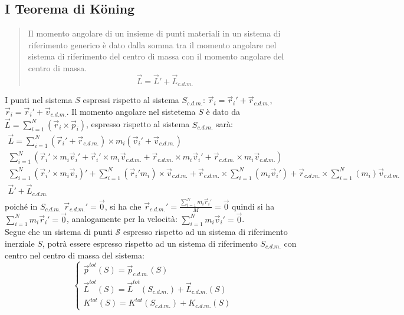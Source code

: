 \documentclass{article}
\numberwithin{equation}{subsection}
\begin{document}
\subsection{I Teorema di K\"oning}
\begin{quotation}
    Il momento angolare di un insieme di punti materiali in un 
    sistema di riferimento generico è dato dalla somma tra 
    il momento angolare nel sistema di riferimento del centro 
    di massa con il momento angolare del centro di massa.
    \begin{equation}
        \vec{L}=\vec{L}'+\vec{L}_{c.d.m.}
    \end{equation}
\end{quotation}
I punti nel sistema $S$ espressi rispetto al sistema $S_{c.d.m.}$: $\vec{r}_i=\vec{r}_i'+\vec{r}_{c.d.m.}$, 
$\vec{r}_i=\vec{r}_i'+\vec{v}_{c.d.m.}$.
Il momento angolare nel sistetema $S$ è dato da $\vec{L}=\displaystyle\sum_{i=1}^{N}(\vec{r}_i\times\vec{p}_i)$, 
espresso rispetto al sistema $S_{c.d.m.}$ sarà: 
\begin{gather}
    \vec{L}=\displaystyle\sum_{i=1}^{N}(\vec{r}_i'+\vec{r}_{c.d.m.})\times m_i(\vec{v}_i'+\vec{v}_{c.d.m.})\\
    \displaystyle\sum_{i=1}^{N}\left(\vec{r}_i'\times m_i\vec{v}_i'+\vec{r}_i'\times m_i\vec{v}_{c.d.m.}+\vec{r}_{c.d.m.}\times m_i\vec{v}_i'+\vec{r}_{c.d.m.}\times m_i\vec{v}_{c.d.m.}\right)\\
    \displaystyle\sum_{i=1}^{N}(\vec{r}_i'\times m_i\vec{v}_i)'+\sum_{i=1}^{N}(\vec{r}_i'm_i)\times \vec{v}_{c.d.m.}+\vec{r}_{c.d.m.}\times\sum_{i=1}^{N}(m_i\vec{v}_i')+\vec{r}_{c.d.m.}\times\sum_{i=1}^{N}(m_i )\vec{v}_{c.d.m.}\\
    \vec{L}'+\vec{L}_{c.d.m.}
\end{gather}
poiché in $S_{c.d.m.}$ $\vec{r}_{c.d.m.}'=\vec{0}$, 
si ha che $\vec{r}_{c.d.m.}'=\displaystyle\frac{\sum_{i=1}^{N}m_i\vec{r}_i'}{M}=\vec{0}$ 
quindi si ha $\sum_{i=1}^{N}m_i\vec{r}_i'=\vec{0}$, analogamente 
per la velocità: $\sum_{i=1}^{N}m_i\vec{v}_i'=\vec{0}$. \\
Segue che un sistema di punti $\mathscr{S}$ espresso rispetto ad 
un sistema di riferimento inerziale $S$, potrà essere espresso 
rispetto ad un sistema di riferimento $S_{c.d.m.}$ con centro 
nel centro di massa del sistema:
\begin{equation}
    \begin{cases}
        \vec{p}^{tot}(S)=\vec{p}_{c.d.m.}(S)\\
        \vec{L}^{tot}(S)=\vec{L}^{tot}(S_{c.d.m.})+\vec{L}_{c.d.m.}(S)\\
        K^{tot}(S)=K^{tot}(S_{c.d.m.})+K_{c.d.m.}(S)
    \end{cases}
\end{equation}
\end{document}
